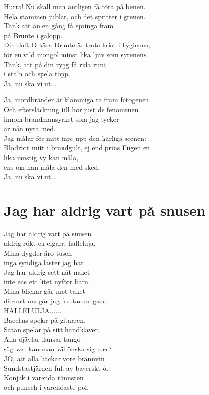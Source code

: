 \documentclass[twoside, openright]{report}
\begin{document}
Hurra! Nu skall man äntligen få röra på benen.\\
Hela stammen jublar, och det spritter i grenen.\\
Tänk att än en gång få springa fram\\
på Brunte i galopp.\\
Din doft O kära Brunte är trots brist i hygienen,\\
för en vild mongol minst lika ljuv som syrenens.\\
Tänk, att på din rygg få rida runt\\
i sta'n och spela topp.\\

Ja, nu ska vi ut...\

Ja, mordbränder är klämmiga ta fram fotogenen.\\
Och eftersläckning till hör just de fenomenen\\
innom brandmansyrket som jag tycker\\
är nån nyta med.\\
Jag målar för mitt inre upp den härliga scenen:\\
Blodrött mitt i brandgult, ej end prins Eugen en\\
lika mustig vy kan måla,\\
ens om han måla den med sked.\\

Ja, nu ska vi ut...\

\section{Jag har aldrig vart på snusen}

Jag har aldrig vart på snusen\\
aldrig rökt en cigarr,  halleluja.\\
Mina dygder äro tusen\\
inga syndiga laster jag har.\\
Jag har aldrig sett nåt naket\\
inte ens ett litet nyförr barn.\\
Mina blickar går mot taket\\
därmet undgår jag frestarens garn.\\

HALLELULJA......\\

Bacchus spelar på gitarren.\\
Satan spelar på sitt handklaver.\\
Alla djävlar dansar tango\\
säg vad kan man väl önska sig mer?\\
JO, att alla bäckar vore brännvin\\
Sundstastjärnen full av bayerskt öl.\\
Konjak i varenda rännsten\\ och punsch i varendaste pol.\\
\end{document}
